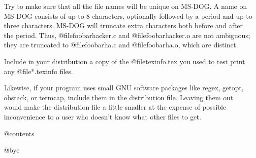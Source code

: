 Try to make sure that all the file names will be unique on MS-DOG.  A
name on MS-DOG consists of up to 8 characters, optionally followed by a
period and up to three characters.  MS-DOG will truncate extra
characters both before and after the period.  Thus,
@file{foobarhacker.c} and @file{foobarhacker.o} are not ambiguous; they
are truncated to @file{foobarha.c} and @file{foobarha.o}, which are
distinct.

Include in your distribution a copy of the @file{texinfo.tex} you used
to test print any @file{*.texinfo} files.

Likewise, if your program uses small GNU software packages like regex,
getopt, obstack, or termcap, include them in the distribution file.
Leaving them out would make the distribution file a little smaller at
the expense of possible inconvenience to a user who doesn't know what
other files to get.

@contents

@bye
